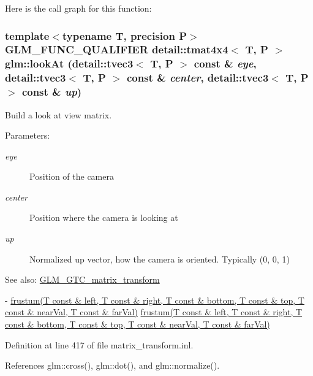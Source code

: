 Here is the call graph for this function:\hypertarget{group__gtc__matrix__transform_g7f4f81d4b0d7b492112eb4d5b184d9be}{
\subsubsection[lookAt]{\setlength{\rightskip}{0pt plus 5cm}template$<$typename T, precision P$>$ GLM\_\-FUNC\_\-QUALIFIER detail::tmat4x4$<$ T, P $>$ glm::lookAt (detail::tvec3$<$ T, P $>$ const \& {\em eye}, \/  detail::tvec3$<$ T, P $>$ const \& {\em center}, \/  detail::tvec3$<$ T, P $>$ const \& {\em up})}}
\label{group__gtc__matrix__transform_g7f4f81d4b0d7b492112eb4d5b184d9be}


Build a look at view matrix.

\begin{Desc}
\item[Parameters:]
\begin{description}
\item[{\em eye}]Position of the camera \item[{\em center}]Position where the camera is looking at \item[{\em up}]Normalized up vector, how the camera is oriented. Typically (0, 0, 1) \end{description}
\end{Desc}
\begin{Desc}
\item[See also:]\hyperlink{group__gtc__matrix__transform}{GLM\_\-GTC\_\-matrix\_\-transform} 

- \hyperlink{group__gtc__matrix__transform_g0ef39da6d6c83806dea5ff455eb225cf}{frustum(T const \& left, T const \& right, T const \& bottom, T const \& top, T const \& nearVal, T const \& farVal)} \hyperlink{group__gtc__matrix__transform_g0ef39da6d6c83806dea5ff455eb225cf}{frustum(T const \& left, T const \& right, T const \& bottom, T const \& top, T const \& nearVal, T const \& farVal)} \end{Desc}


Definition at line 417 of file matrix\_\-transform.inl.

References glm::cross(), glm::dot(), and glm::normalize().

